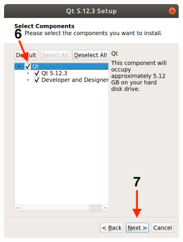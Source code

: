 \begin{figure}[H]
\begin{subfigure}{0.32\linewidth}
        \includegraphics[width=1\textwidth]{Images/Qt6.png}
    \end{subfigure}
    \begin{subfigure}{0.32\linewidth}

\end{subfigure}
\end{figure}
